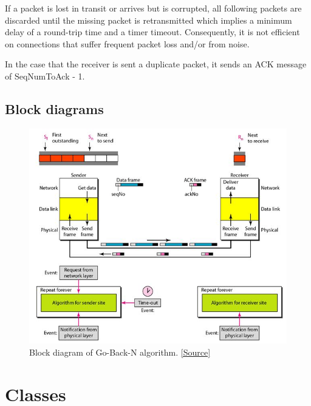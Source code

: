 \documentclass[12pt]{article}
\begin{document}
If a packet is lost in transit or arrives but is corrupted, all following packets are discarded until the missing packet is retransmitted which implies a minimum delay of a round-trip time and a timer timeout. Consequently, it is not efficient on connections that suffer frequent packet loss and/or from noise.

In the case that the receiver is sent a duplicate packet, it sends an ACK message of SeqNumToAck - 1.


\newpage
\subsection{Block diagrams}

\begin{figure}[!htb]
	\centering
	\includegraphics[width=.9\linewidth]{gbn.jpg}
	\caption{Block diagram of Go-Back-N algorithm. \href{http://www.myreadingroom.co.in/notes-and-studymaterial/68-dcn/813-go-back-n-arq-protocol.html}{[Source]}}\label{fig:fig1}
\end{figure}

\section{Classes}
\end{document}
